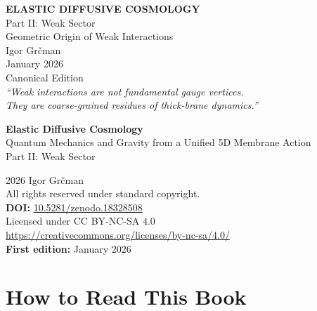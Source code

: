 \documentclass[11pt,a4paper]{book}
\theoremstyle{definition}
\theoremstyle{remark}
\begin{document}
\frontmatter

\begin{titlepage}
\centering
\vspace*{2cm}
{\Huge\bfseries ELASTIC DIFFUSIVE COSMOLOGY}\\[1.5cm]
{\Large Part II: Weak Sector}\\[0.5cm]
{\large Geometric Origin of Weak Interactions}\\[2cm]
{\Large Igor Gr\v{c}man}\\[1cm]
{\large January 2026}\\[0.5cm]
{\small Canonical Edition}\\[2cm]
\vfill
{\large\itshape ``Weak interactions are not fundamental gauge vertices.\\
They are coarse-grained residues of thick-brane dynamics.''}
\end{titlepage}

\newpage
\thispagestyle{empty}
\vspace*{3cm}
\begin{center}
{\Large\bfseries Elastic Diffusive Cosmology}\\[0.3cm]
{\normalsize Quantum Mechanics and Gravity from a Unified 5D Membrane Action}\\[0.5cm]
{\large Part II: Weak Sector}\\[1.5cm]
\end{center}
\noindent\textcopyright{} 2026 Igor Gr\v{c}man\\[0.3cm]
All rights reserved under standard copyright.\\[0.5cm]
\noindent\textbf{DOI:} \href{https://doi.org/10.5281/zenodo.18328508}{10.5281/zenodo.18328508}\\[1cm]
\noindent Licensed under CC BY-NC-SA 4.0\\
\url{https://creativecommons.org/licenses/by-nc-sa/4.0/}\\[1.5cm]
\noindent\textbf{First edition:} January 2026\\
\vfill

\chapter*{How to Read This Book}
\end{document}
